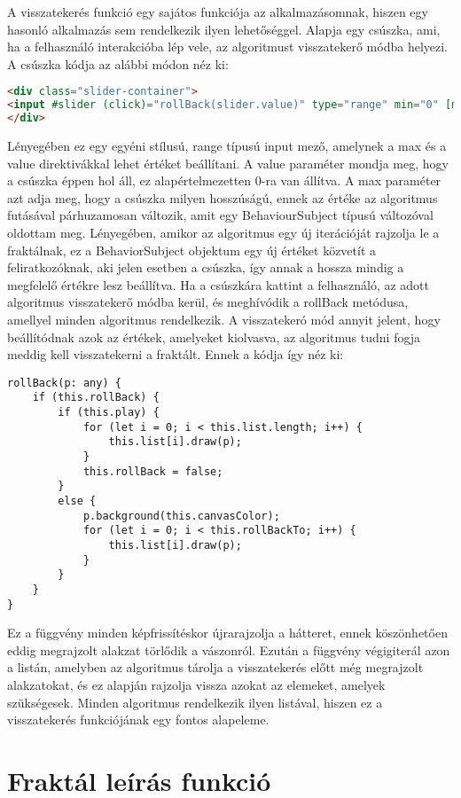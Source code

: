 A visszatekerés funkció egy sajátos funkciója az alkalmazásomnak, hiszen egy hasonló alkalmazás sem rendelkezik ilyen lehetőséggel. Alapja egy csúszka, ami, ha a felhasználó interakcióba lép vele, az algoritmust visszatekerő módba helyezi. A csúszka kódja az alábbi módon néz ki:
\begin{lstlisting}[language=html]
<div class="slider-container">
<input #slider (click)="rollBack(slider.value)" type="range" min="0" [max]="sliderLength" [value]="sliderLength" class="slider" id="myRange">
</div>
\end{lstlisting}
Lényegében ez egy egyéni stílusú, range típusú input mező, amelynek a max és a value direktivákkal lehet értéket beállítani. A value paraméter mondja meg, hogy a csúszka éppen hol áll, ez alapértelmezetten 0-ra van állítva. A max paraméter azt adja meg, hogy a csúszka milyen hosszúságú, ennek az értéke az algoritmus futásával párhuzamosan változik, amit egy BehaviourSubject típusú változóval oldottam meg. Lényegében, amikor az algoritmus egy új iterációját rajzolja le a fraktálnak, ez a BehaviorSubject objektum egy új értéket közvetít a feliratkozóknak, aki jelen esetben a csúszka, így annak a hossza mindig a megfelelő értékre lesz beállítva. Ha a csúszkára kattint a felhasználó, az adott algoritmus visszatekerő módba kerül, és meghívódik a rollBack metódusa, amellyel minden algoritmus rendelkezik. A visszatekeró mód annyit jelent, hogy beállítódnak azok az értékek, amelyeket kiolvasva, az algoritmus tudni fogja meddig kell visszatekerni a fraktált. Ennek a kódja így néz ki:
\begin{lstlisting}
rollBack(p: any) {
	if (this.rollBack) {
		if (this.play) {
			for (let i = 0; i < this.list.length; i++) {
				this.list[i].draw(p);
			}
			this.rollBack = false;
		}
		else {
			p.background(this.canvasColor);
			for (let i = 0; i < this.rollBackTo; i++) {
				this.list[i].draw(p);
			}
		}
	}
}
\end{lstlisting}
Ez a függvény minden képfrissítéskor újrarajzolja a hátteret, ennek köszönhetően eddig megrajzolt alakzat törlődik a vászonról. Ezután a függvény végigiterál azon a listán, amelyben az algoritmus tárolja a visszatekerés előtt még megrajzolt alakzatokat, és ez alapján rajzolja vissza azokat az elemeket, amelyek szükségesek. Minden algoritmus rendelkezik ilyen listával, hiszen ez a visszatekerés funkciójának egy fontos alapeleme.


\section{Fraktál leírás funkció}

